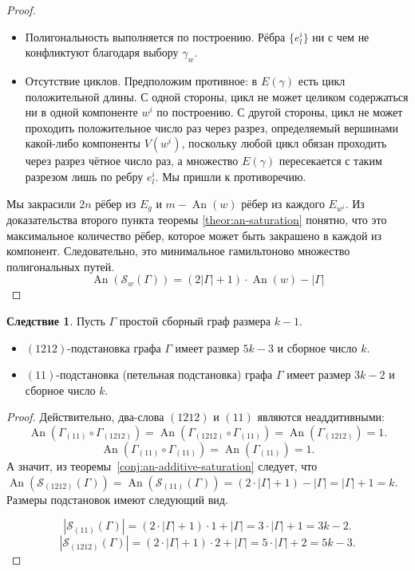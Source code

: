 \documentclass{article}
\theoremstyle{definition}
\newtheorem{corollary}[theorem]{Следствие}
\newcommand{\An}{\operatorname{An}}
\begin{document}
\begin{proof}
    \begin{itemize}
        \item Полигональность выполняется по построению. Рёбра $\{e_l^i\}$ ни с чем не конфликтуют благодаря выбору $\gamma_w$. 
        \item Отсутствие циклов. Предположим противное: в $E(\gamma)$ есть цикл положительной длины. С одной стороны, цикл не может целиком содержаться ни в одной компоненте $w^i$ по построению. С другой стороны, цикл не может проходить положительное число раз через разрез, определяемый вершинами какой-либо компоненты $V(w^i)$, поскольку любой цикл обязан проходить через разрез чётное число раз, а множество $E(\gamma)$ пересекается с таким разрезом лишь по ребру $e^i_l$. Мы пришли к противоречию.
    \end{itemize} 
     Мы закрасили $2n$ рёбер из $E_g$ и $m - \An(w)$ рёбер из каждого $E_{w^i}$. Из доказательства второго пункта теоремы \ref{theor:an-saturation} понятно, что это максимальное количество рёбер, которое может быть закрашено в каждой из компонент. Следовательно, это минимальное гамильтоново множество полигональных путей.
    \[
    \An(\mathcal{S}_w(\Gamma)) = (2|\Gamma| + 1)\cdot\An(w) - |\Gamma|
    \]
\end{proof}

\begin{corollary}\label{cor:pretzelsat5k-3}
    Пусть $\Gamma$ простой сборный граф размера $k-1$.
    \begin{itemize}
        \item $(1212)$-подстановка графа $\Gamma$ имеет размер $5k - 3$ и сборное число $k$.
        \item $(11)$-подстановка (петельная подстановка) графа $\Gamma$  имеет размер $3k - 2$ и сборное число $k$.
    \end{itemize}
\end{corollary}

\begin{proof}
Действительно, два-слова $(1212)$ и $(11)$ являются неаддитивными:
\[
    \An(\Gamma_{(11)} \circ \Gamma_{(1212)}) = \An(\Gamma_{(1212)} \circ \Gamma_{(11)}) =\An(\Gamma_{(1212)}) = 1.
\]
\[
    \An(\Gamma_{(11)} \circ \Gamma_{(11)}) = \An(\Gamma_{(11)}) = 1.
\] 
А значит, из теоремы~\ref{conj:an-additive-saturation} следует, что $\An(\mathcal{S}_{(1212)}(\Gamma)) = \An(\mathcal{S}_{(11)}(\Gamma)) = (2\cdot |\Gamma| + 1) -|\Gamma| = |\Gamma| + 1 = k$. Размеры подстановок имеют следующий вид.

\[
    |\mathcal{S}_{(11)}(\Gamma)| = (2\cdot |\Gamma| + 1) \cdot 1 + |\Gamma| = 3\cdot |\Gamma| + 1 = 3k - 2.
\]
\[
    |\mathcal{S}_{(1212)}(\Gamma)| = (2\cdot |\Gamma| + 1) \cdot 2 + |\Gamma| = 5\cdot |\Gamma| + 2 = 5k - 3.
\]
\end{proof}
\end{document}
